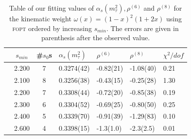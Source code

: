 \documentclass[../../index.tex]{subfiles}
\begin{document}
\begin{table}
  \centering
  \begin{tabularx}{\textwidth}{cccYYYY}
    \toprule
    & \(s_{min}\) & \#\(s_0\)s & \(\alpha_s(m_\tau^2)\) & \(\rho^{(6)}\) & \(\rho^{(8)}\) & \(\chi^2/dof\)  \\
    \midrule
    \parbox[t]{2mm}{}
    & 2.200 & 7 & 0.3274(42) & -0.82(21) & -1.08(40) & 0.21 \\
    \midrule
    \parbox[t]{2mm}{}
    & 2.100 & 8 & 0.3256(38) & -0.43(15) & -0.25(28) & 1.30 \\
    & 2.200 & 7 & 0.3308(44) & -0.72(20) & -0.85(38) & 0.19 \\
    & 2.300 & 6 & 0.3304(52) & -0.69(25) & -0.80(50) & 0.25 \\
    & 2.400 & 5 & 0.3339(70) & -0.91(39) & -1.29(83) & 0.10 \\
    & 2.600 & 4 & 0.3398(15) & -1.3(1.0) & -2.3(2.5) & 0.01  \\
    \bottomrule
  \end{tabularx}
  \caption{Table of our fitting values of \(\alpha_s(m_\tau^2), \rho^{(6)}\) and
    \(\rho^{(8)}\) for the kinematic weight \(\omega(x)=(1-x)^2(1+2x)\) using
    \textsc{fopt} ordered by increasing \(s_{min}\). The errors are given in
    parenthesis after the observed value.}
  \label{table:fitWKinAlD6D8}
\end{table}
\end{document}

